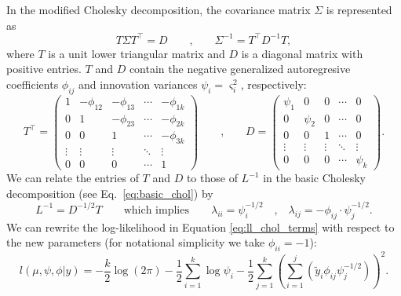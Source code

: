 \documentclass{article}
\begin{document}
In the modified Cholesky decomposition, the covariance matrix $\Sigma$ is 
represented as
%
\begin{equation}
 T \Sigma T^\top = D
 \qquad \text{,} \qquad
	\Sigma^{-1} = T^\top D^{-1} T,
\end{equation}
%
where $T$ is a unit lower triangular matrix and $D$ is a diagonal matrix with 
positive entries. $T$ and $D$ contain the negative generalized autoregresive coefficients 
$\phi_{ij}$ and innovation variances $\psi_i = \varsigma_i^2$, respectively:
%
\begin{equation}
	T^\top=
  \begin{pmatrix}
    1 & -\phi_{12} & -\phi_{13} & \cdots & -\phi_{1k} \\
    0 & 1 & -\phi_{23} & \cdots & -\phi_{2k} \\
    0 & 0 & 1 & \cdots & -\phi_{3k} \\
    \vdots & \vdots & \vdots & \ddots & \vdots \\
    0 & 0 & 0 & \cdots & 1
  \end{pmatrix}
	\qquad \text{,} \qquad
	D =
  \begin{pmatrix}
    \psi_1 & 0 & 0 & \cdots & 0 \\
    0 & \psi_2 & 0 & \cdots & 0 \\
    0 & 0 & 1 & \cdots & 0 \\
    \vdots & \vdots & \vdots & \ddots & \vdots \\
    0 & 0 & 0 & \cdots & \psi_k
  \end{pmatrix}.
\end{equation}
%
We can relate the entries of $T$ and $D$ to those of $L^{-1}$ in the basic Cholesky 
decomposition (see Eq.\ \ref{eq:basic_chol}) by 
%
\begin{equation}
  L^{-1} = D^{-1/2} T \qquad \text{which implies} \qquad
	\lambda_{ii} = \psi_i^{-1/2} \quad \text{,} \quad
        \lambda_{ij} = -\phi_{ij} \cdot \psi_j^{-1/2}.
  \label{eq:relate_basic_mod}
\end{equation}
%
We can rewrite the log-likelihood in Equation \ref{eq:ll_chol_terms} 
with respect to the new parameters (for notational simplicity we 
take $\phi_{ii} = -1$):
%
\begin{equation}
	l(\mu, \psi, \phi | y) = -\frac{k}{2}\log(2\pi) - \frac{1}{2} \sum_{i=1}^k 
	\log{\psi_i} - \frac{1}{2} \sum_{j=1}^k 
	\left( \sum_{i=1}^j \left( \tilde{y}_i \phi_{ij} \psi_j^{-1/2} 
	\right) \right)^2.
 \label{eq:ll_mod_chol}
\end{equation}
%
\end{document}
